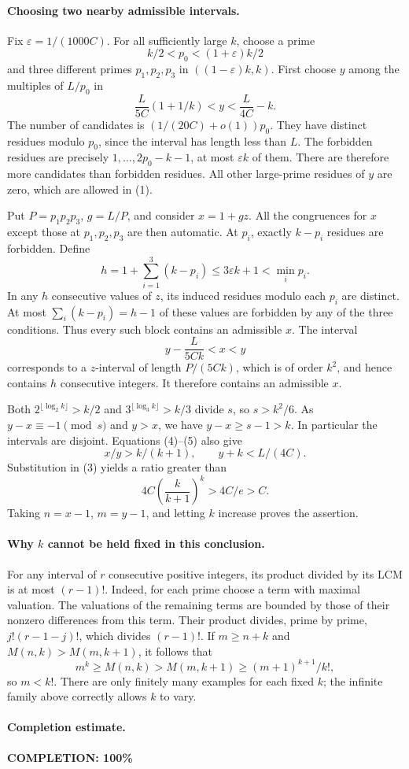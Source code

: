 \paragraph{Choosing two nearby admissible intervals.}
Fix \(\varepsilon=1/(1000C)\). For all sufficiently large \(k\),
choose a prime
\[
 k/2<p_0<(1+\varepsilon)k/2
\]
and three different primes \(p_1,p_2,p_3\) in
\(((1-\varepsilon)k,k)\).
First choose \(y\) among the multiples of \(L/p_0\) in
\[
 \frac L{5C}(1+1/k)<y<\frac L{4C}-k.                            \tag{4}
\]
The number of candidates is
\((1/(20C)+o(1))p_0\). They have distinct residues modulo \(p_0\),
since the interval has length less than \(L\).
The forbidden residues are precisely
\(1,\ldots,2p_0-k-1\), at most \(\varepsilon k\) of them.
There are therefore more candidates than forbidden residues.
All other large-prime residues of \(y\) are zero, which are
allowed in (1).

Put \(P=p_1p_2p_3\), \(g=L/P\), and consider \(x=1+gz\).
All the congruences for \(x\) except those at \(p_1,p_2,p_3\)
are then automatic. At \(p_i\), exactly \(k-p_i\) residues
are forbidden. Define
\[
 h=1+\sum_{i=1}^3(k-p_i)\leq3\varepsilon k+1<\min_i p_i.
\]
In any \(h\) consecutive values of \(z\), its induced residues
modulo each \(p_i\) are distinct. At most \(\sum_i(k-p_i)=h-1\)
of these values are forbidden by any of the three conditions.
Thus every such block contains an admissible \(x\).
The interval
\[
 y-\frac L{5Ck}<x<y                                             \tag{5}
\]
corresponds to a \(z\)-interval of length \(P/(5Ck)\), which is
of order \(k^2\), and hence contains \(h\) consecutive integers.
It therefore contains an admissible \(x\).

Both \(2^{\lfloor\log_2 k\rfloor}>k/2\) and
\(3^{\lfloor\log_3 k\rfloor}>k/3\) divide \(s\), so \(s>k^2/6\).
As \(y-x\equiv-1\pmod s\) and \(y>x\), we have
\(y-x\geq s-1>k\). In particular the intervals are disjoint.
Equations (4)--(5) also give
\[
 x/y>k/(k+1),\qquad y+k<L/(4C).
\]
Substitution in (3) yields a ratio greater than
\[
 4C\left(\frac{k}{k+1}\right)^k>4C/e>C.
\]
Taking \(n=x-1\), \(m=y-1\), and letting \(k\) increase proves
the assertion.

\paragraph{Why \(k\) cannot be held fixed in this conclusion.}
For any interval of \(r\) consecutive positive integers,
its product divided by its LCM is at most \((r-1)!\).
Indeed, for each prime choose a term with maximal valuation.
The valuations of the remaining terms are bounded by those of
their nonzero differences from this term. Their product divides,
prime by prime, \(j!(r-1-j)!\), which divides \((r-1)!\).
If \(m\geq n+k\) and \(M(n,k)>M(m,k+1)\), it follows that
\[
 m^k\geq M(n,k)>M(m,k+1)\geq (m+1)^{k+1}/k!,
\]
so \(m<k!\). There are only finitely many examples for each fixed
\(k\); the infinite family above correctly allows \(k\) to vary.

\paragraph{Completion estimate.}
\textbf{COMPLETION: 100\%}
